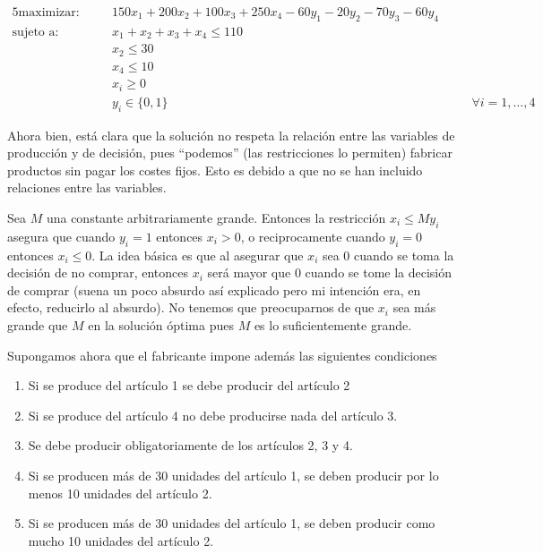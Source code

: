 \begin{alignat}{5}
    \text{maximizar:}   & \quad & 150x_1+200x_2+100x_3+250x_4-60y_1-20y_2-70y_3-60y_4   & \quad &           \\
    \text{sujeto a:}    & \quad & x_1+x_2+x_3+x_4\leq 110                               &       &           \\
                        & \quad & x_2\leq 30                                            &       &           \\
                        & \quad & x_4\leq 10                                            &       &           \\
                        & \quad & x_i\geq 0                                             &       &           \\
                        & \quad & y_i\in \{0, 1\}                                       &       & \forall i=1,\dots,4          
\end{alignat}

Ahora bien, está clara que la solución no respeta la relación entre las variables de producción y de decisión, pues ``podemos''
(las restricciones lo permiten) fabricar productos sin pagar los costes fijos. Esto es debido a que no se han incluido
relaciones entre las variables. 

\newpage

Sea $M$ una constante arbitrariamente grande. Entonces la restricción $x_i\leq My_i$ asegura que cuando $y_i=1$ entonces 
$x_i>0$, o reciprocamente cuando $y_i=0$ entonces $x_i\leq 0$. La idea básica es que al asegurar que $x_i$ sea 0 cuando se
toma la decisión de no comprar, entonces $x_i$ será mayor que 0 cuando se tome la decisión de comprar (suena un poco absurdo
así explicado pero mi intención era, en efecto, reducirlo al absurdo). No tenemos que preocuparnos de que $x_i$ sea más grande
 que $M$ en la solución óptima pues $M$ es lo suficientemente grande.

\vspace*{2mm}

\noindent Supongamos ahora que el fabricante impone además las siguientes condiciones

\begin{enumerate}
    \item Si se produce del artículo 1 se debe producir del artículo 2
    \item Si se produce del artículo 4 no debe producirse nada del artículo 3.
    \item Se debe producir obligatoriamente de los artículos 2, 3 y 4.
    \item Si se producen más de 30 unidades del artículo 1, se deben producir por lo menos 10 unidades del artículo 2.
    \item Si se producen más de 30 unidades del artículo 1, se deben producir como mucho 10 unidades del artículo 2.
\end{enumerate}

